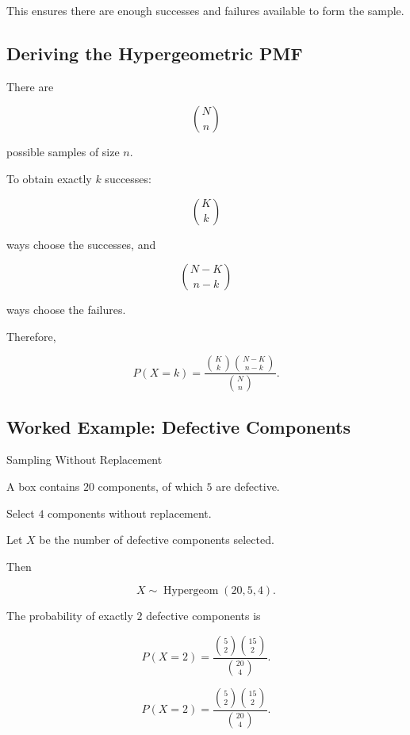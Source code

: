 This ensures there are enough successes and failures available to form
the sample.

\subsection{Deriving the Hypergeometric PMF}
\label{subsec:derive-hypergeometric}

There are

\[
\binom Nn
\]

possible samples of size \(n\).

To obtain exactly \(k\) successes:

\[
\binom Kk
\]

ways choose the successes, and

\[
\binom{N-K}{n-k}
\]

ways choose the failures.

Therefore,

\[
\boxed{
P(X=k)
=
\frac{
\binom Kk
\binom{N-K}{n-k}
}{
\binom Nn
}.
}
\]

\subsection{Worked Example: Defective Components}
\label{subsec:worked-hypergeometric}

\begin{workedexamplebox}{Sampling Without Replacement}

A box contains \(20\) components, of which \(5\) are defective.

Select \(4\) components without replacement.

Let \(X\) be the number of defective components selected.

Then

\[
X
\sim
\operatorname{Hypergeom}(20,5,4).
\]

The probability of exactly \(2\) defective components is

\[
P(X=2)
=
\frac{
\binom52
\binom{15}{2}
}{
\binom{20}{4}
}.
\]

\begin{answerbox}
\[
\boxed{
P(X=2)
=
\frac{
\binom52\binom{15}{2}
}{
\binom{20}{4}
}.
}
\]
\end{answerbox}

\end{workedexamplebox}

